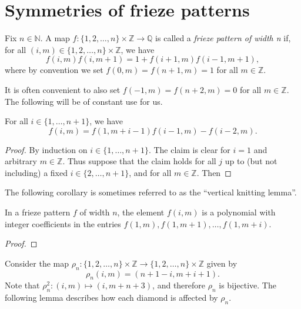 \chapter{Symmetries of frieze patterns}\label{s:fp}
\begin{definition}
\label{def:closed-fp}
\leanok
    Fix $n \in \mathbb{N}$. A map $f : \{1,2,\ldots , n\} \times \mathbb{Z} \longrightarrow \mathbb{Q}$ is called
    a \textit{frieze pattern of width n} if, for all $(i,m) \in \{1,2,\ldots , n\} \times \mathbb{Z}$, we have
    \[
        f(i,m) f(i,m+1) = 1 + f(i+1,m) f(i-1, m+1),
    \]
    where by convention we set $f(0,m) = f(n+1,m) = 1$ for all $m \in \mathbb{Z}$. 
\end{definition}
It is often convenient to also set $f(-1,m) = f(n+2,m) = 0$ for all $m \in \mathbb{Z}$. The following will be of constant use for us.

\begin{lemma}
    \label{l:continuant}
    For all $i \in \{1, \ldots , n+1\}$, we have 
    \[
        f(i,m) = f(1,m+i-1) f(i-1,m) - f(i-2,m).
    \]
\end{lemma}
\begin{proof}
    By induction on $i \in \{1, \ldots, n+1\}$. The claim is clear for $i =1$ and arbitrary $m \in \mathbb{Z}$. Thus suppose that the 
    claim holds for all $j$ up
    to (but not including) a fixed $i \in \{2, \ldots, n+1\}$, and for all $m \in \mathbb{Z}$. Then  
\end{proof}

The following corollary is sometimes referred to as the ``vertical knitting lemma''.  
\begin{corollary}
    \label{l:horiztonal-knit}
    In a frieze pattern $f$ of width $n$, the element $f(i,m)$ is a polynomial with integer coefficients in the 
    entries $f(1,m), f(1,m+1), \ldots, f(1,m+i)$. 
\end{corollary}
\begin{proof}

\end{proof}

Consider the map $\rho_n: \{1,2,\ldots , n\} \times \mathbb{Z} \longrightarrow \{1,2,\ldots , n\} \times \mathbb{Z}$ given by
\begin{equation}  
\label{def:glide}
    \rho_n(i,m) = (n+1-i, m+i+1).
\end{equation}
Note that $\rho_n^2 : (i,m) \mapsto (i,m+n+3)$, and therefore $\rho_n$ is bijective. The following lemma describes how 
each diamond is affected by $\rho_n$.

